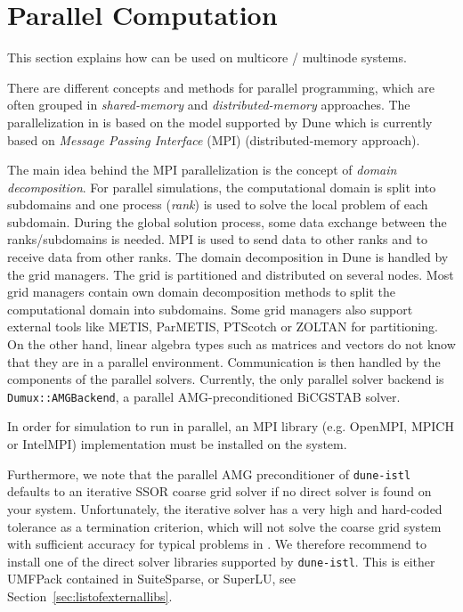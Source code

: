 \section{Parallel Computation}
\label{sec:parallelcomputation}
This section explains how \Dumux can be used
on multicore / multinode systems.

There are different concepts and methods for parallel programming, which are
often grouped in \textit{shared-memory} and \textit{distributed-memory}
approaches. The parallelization in \Dumux is based on the model supported by Dune which is currently based on
\textit{Message Passing Interface} (MPI) (distributed-memory approach).

The main idea behind the MPI parallelization is the concept of \textit{domain
decomposition}. For parallel simulations, the computational domain is split into
subdomains and one process (\textit{rank}) is used to solve the local problem of each
subdomain. During the global solution process, some data exchange between the
ranks/subdomains is needed. MPI is used to send data to other ranks and to receive
data from other ranks. The domain decomposition in Dune is handled by the grid managers.
The grid is partitioned and distributed on several nodes. Most grid managers contain own domain decomposition methods to split the
computational domain  into subdomains. Some grid managers also support external
tools like METIS, ParMETIS, PTScotch or ZOLTAN for partitioning.
On the other hand, linear algebra types such as matrices and vectors
do not know that they are in a parallel environment. Communication is then handled by the components of the
parallel solvers. Currently, the only parallel solver backend is \texttt{Dumux::AMGBackend}, a parallel AMG-preconditioned
BiCGSTAB solver.

In order for \Dumux simulation to run in parallel, an
MPI library (e.g. OpenMPI, MPICH or IntelMPI) implementation
must be installed on the system.

Furthermore, we note that the parallel AMG preconditioner of \texttt{dune-istl}
defaults to an iterative SSOR coarse grid solver if no direct solver is found on your system. Unfortunately,
the iterative solver has a very high and hard-coded tolerance as a termination criterion, which will not solve
the coarse grid system with sufficient accuracy for typical problems in \Dumux. We therefore recommend
to install one of the direct solver libraries supported by \texttt{dune-istl}. This is either UMFPack contained
in SuiteSparse, or SuperLU, see Section~\ref{sec:listofexternallibs}.

